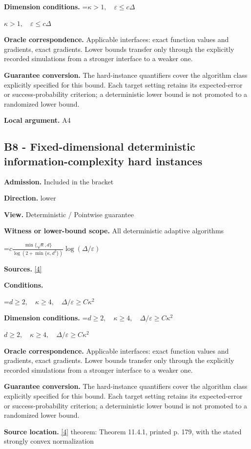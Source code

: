 \documentclass[10pt,a4paper]{article}
\newcommand{\AtlasMath}[1]{\par\begingroup\centering\setbox0=\hbox{$\displaystyle #1$}\ifdim\wd0>1.4\linewidth\typeout{ATLAS WIDE FORMULA: \the\wd0}\fi\ifdim\wd0>\linewidth\resizebox{\linewidth}{!}{\box0}\else\box0\fi\par\endgroup}
\newcommand{\AtlasInlineMath}[1]{\begingroup\setbox0=\hbox{$#1$}\ifdim\wd0>.4\linewidth\endgroup\AtlasMath{#1}\else\endgroup$#1$\fi}
\begin{document}
\textbf{Dimension conditions.} \AtlasInlineMath{\kappa>1,\quad\varepsilon\le c\Delta}

\textbf{Oracle correspondence.} Applicable interfaces: exact function values and gradients, exact gradients. Lower bounds transfer only through the explicitly recorded simulations from a stronger interface to a weaker one.

\textbf{Guarantee conversion.} The hard-instance quantifiers cover the algorithm class explicitly specified for this bound. Each target setting retains its expected-error or success-probability criterion; a deterministic lower bound is not promoted to a randomized lower bound.

\textbf{Local argument.} A4

\subsection{B8 - Fixed-dimensional deterministic information-complexity hard instances}
\textbf{Admission.} Included in the bracket

\textbf{Direction.} lower

\textbf{View.} Deterministic / Pointwise guarantee

\textbf{Witness or lower-bound scope.} All deterministic adaptive algorithms

\AtlasMath{c\frac{\min\{\sqrt\kappa,d\}}{\log(2+\min\{\kappa,d^2\})}\log(\Delta/\varepsilon)}
\textbf{Sources.} \href{https://www2.isye.gatech.edu/~nemirovs/LecEMCO.pdf}{[4]}

\textbf{Conditions.} 
\AtlasMath{d\ge2,\quad\kappa\ge4,\quad\Delta/\varepsilon\ge C\kappa^2}


\textbf{Dimension conditions.} \AtlasInlineMath{d\ge2,\quad\kappa\ge4,\quad\Delta/\varepsilon\ge C\kappa^2}

\textbf{Oracle correspondence.} Applicable interfaces: exact function values and gradients, exact gradients. Lower bounds transfer only through the explicitly recorded simulations from a stronger interface to a weaker one.

\textbf{Guarantee conversion.} The hard-instance quantifiers cover the algorithm class explicitly specified for this bound. Each target setting retains its expected-error or success-probability criterion; a deterministic lower bound is not promoted to a randomized lower bound.

\textbf{Source location.} \href{https://www2.isye.gatech.edu/~nemirovs/LecEMCO.pdf}{[4]} theorem: Theorem 11.4.1, printed p. 179, with the stated strongly convex normalization
\end{document}
